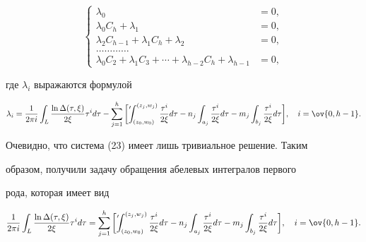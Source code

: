 \begin{equation} 


\left\{ 


\begin{split} 


\lambda_0&=0,\\ 


\lambda_0C_h+\lambda_1&=0,\\ 


\lambda_2C_{h-1}+\lambda_1C_h+\lambda_2&=0,\\ 


\dotsc\dotsc\dotsc\dotsc&\  \\ 


\lambda_0C_2+\lambda_1C_3+\dotsb+\lambda_{h-2}C_h+ 


\lambda_{h-1}&=0, 


\end{split} 


\right. 


\end{equation} 


где $\lambda_i$ выражаются формулой 


$$ 


\lambda_i=\frac{1}{2\pi i}\int_L 


\frac{\ln\Delta(\tau,\xi)}{2\xi}\tau^id\tau- 


\sum^h_{j=1}\bigg[\fuckprime 


\int^{(z_j,w_j)}_{(z_0,w_0)}\frac{\tau^i}{2\xi}d\tau- 


n_j\int_{a_j}\frac{\tau^i}{2\xi}d\tau- 


m_j\int_{b_j}\frac{\tau^i}{2\xi}d\tau\bigg], 


\quad i=\ov{0,h-1}. 


$$ 


Очевидно, что система (23) имеет лишь тривиальное решение. Таким 


образом, получили задачу обращения абелевых интегралов первого 


рода, которая имеет вид 


\begin{equation} 


\frac{1}{2\pi i}\int_L 


\frac{\ln\Delta(\tau,\xi)}{2\xi}\tau^id\tau=\sum^h_{j=1}\bigg[ 


\fuckprime\int^{(z_j,w_j)}_{(z_0,w_0)} 


\frac{\tau^i}{2\xi}d\tau-n_j\int_{a_j}\frac{\tau^i}{2\xi}d\tau- 


m_j\int_{b_j}\frac{\tau^i}{2\xi}d\tau\bigg],\quad 


i=\ov{0,h-1}. 


\end{equation} 


